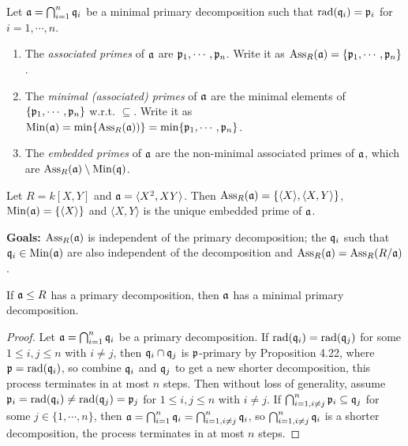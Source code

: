 \begin{definition}
    Let $\mathfrak{a} = \bigcap_{i=1}^{n} \mathfrak{q}_i$ be a minimal primary decomposition such that $\operatorname{rad}(\mathfrak{q}_i) = \mathfrak{p}_i$ for $i = 1,\cdots,n$.
    \begin{enumerate}
        \item The \emph{associated primes} of $\mathfrak{a}$ are $\mathfrak{p}_1,\cdots,\mathfrak{p}_n$. Write it as $\operatorname{Ass}_R(\mathfrak{a}) = \{\mathfrak{p}_1,\cdots,\mathfrak{p}_n\}$.
        \item The \emph{minimal (associated) primes} of $\mathfrak{a}$ are the minimal elements of $\{\mathfrak{p}_1,\cdots,\mathfrak{p}_n\}$ w.r.t. $\subseteq$. Write it as $\operatorname{Min}(\mathfrak{a}) = \min\{\operatorname{Ass}_R(\mathfrak{a}))\} = \min\{\mathfrak{p}_1,\cdots,\mathfrak{p}_n\}$.
        \item The \emph{embedded primes} of $\mathfrak{a}$ are the non-minimal associated primes of $\mathfrak{a}$, which are $\operatorname{Ass}_R(\mathfrak{a}) \setminus \operatorname{Min}(\mathfrak{q})$.
    \end{enumerate}
\end{definition}

\begin{example}
    Let $R = k[X,Y]$ and $\mathfrak{a} = \langle X^{2},XY \rangle$. Then $\operatorname{Ass}_R(\mathfrak{a}) = \{\langle X \rangle, \langle X,Y \rangle\}$, $\operatorname{Min}(\mathfrak{a}) = \{\langle X \rangle\}$ and $\langle X,Y \rangle$ is the unique embedded prime of $\mathfrak{a}$.
\end{example}

\noindent \textbf{Goals:} $\operatorname{Ass}_R(\mathfrak{a})$ is independent of the primary decomposition; the $\mathfrak{q}_i$ such that $\mathfrak{q}_i \in \operatorname{Min}(\mathfrak{a})$ are also independent of the decomposition and $\operatorname{Ass}_R(\mathfrak{a}) = \operatorname{Ass}_R(R/\mathfrak{a})$.

\begin{proposition}
    If $\mathfrak{a} \leq R$ has a primary decomposition, then $\mathfrak{a}$ has a minimal primary decomposition.
\end{proposition}

\begin{proof}
    Let $\mathfrak{a} = \bigcap_{i=1}^{n} \mathfrak{q}_i$ be a primary decomposition. If $\operatorname{rad}(\mathfrak{q}_i) = \operatorname{rad}(\mathfrak{q}_j)$ for some $1 \leq i,j \leq n$ with $i \neq j$, then $\mathfrak{q}_i \cap \mathfrak{q}_j$ is $\mathfrak{p}$-primary by Proposition 4.22, where $\mathfrak{p} = \operatorname{rad}(\mathfrak{q}_i)$, so combine $\mathfrak{q}_i$ and $\mathfrak{q}_j$ to get a new shorter decomposition, this process terminates in at most $n$ steps. Then without loss of generality, assume $\mathfrak{p}_i = \operatorname{rad}(\mathfrak{q}_i) \neq \operatorname{rad}(\mathfrak{q}_j) = \mathfrak{p}_j$ for $1 \leq i,j \leq n$ with $i \neq j$. If $\bigcap_{i=1,i\neq j}^{n} \mathfrak{p}_i \subseteq \mathfrak{q}_j$ for some $j \in \{1,\cdots,n\}$, then $\mathfrak{a} = \bigcap_{i=1}^{n} \mathfrak{q}_i = \bigcap_{i=1,i \neq j}^{n} \mathfrak{q}_i$, so $\bigcap_{i=1,i \neq j}^{n} \mathfrak{q}_i$ is a shorter decomposition, the process terminates in at most $n$ steps.
\end{proof}

